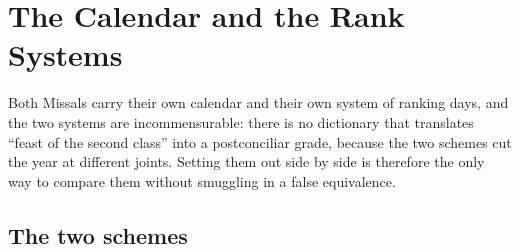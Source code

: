 \section{The Calendar and the Rank Systems}

Both Missals carry their own calendar and their own system of ranking days, and the two systems are incommensurable: there is no dictionary that translates ``feast of the second class'' into a postconciliar grade, because the two schemes cut the year at different joints. Setting them out side by side is therefore the only way to compare them without smuggling in a false equivalence.

\subsection{The two schemes}

